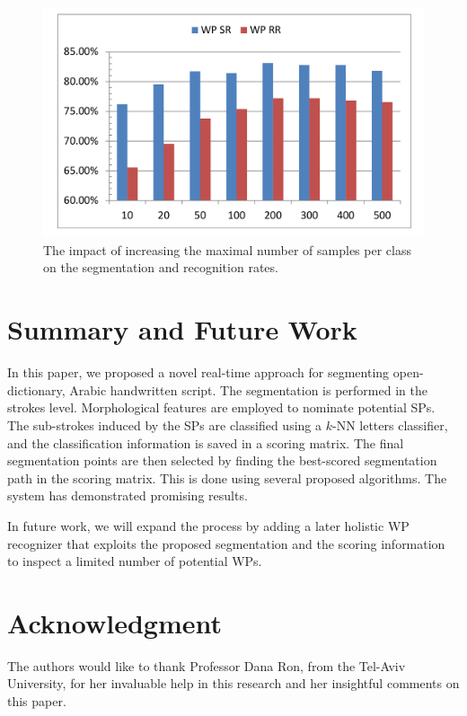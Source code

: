 \documentclass[10pt, conference, compsocconf]{IEEEtran}
\begin{document}
\begin{figure}
\centering
\includegraphics[width=1\columnwidth]{./figures/num_letter_impact}
\caption{The impact of increasing the maximal number of samples per class on the segmentation and recognition rates.}
\label{fig:num_letter_impact}
\vspace{-10pt}
\end{figure}

\section{Summary and Future Work}
In this paper, we proposed a novel real-time approach for segmenting open-dictionary, Arabic handwritten script.
The segmentation is performed in the strokes level. 
Morphological features are employed to nominate potential SPs. 
The sub-strokes induced by the SPs are classified using a $k$-NN letters classifier, and the classification information is saved in a scoring matrix.
The final segmentation points are then selected by finding the best-scored segmentation path in the scoring matrix. 
This is done using several proposed algorithms. 
The system has demonstrated promising results.

In future work, we will expand the process by adding a later holistic WP recognizer that exploits the proposed segmentation and the scoring information to inspect a limited number of potential WPs.

\section*{Acknowledgment}
The authors would like to thank Professor Dana Ron, from the Tel-Aviv University, for her invaluable help in this research and her insightful comments on this paper. \\

\linespread{0.9}


\end{document}
